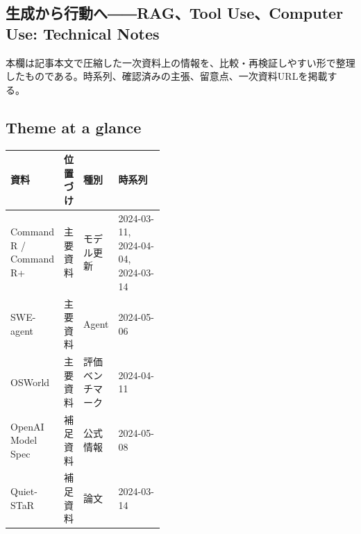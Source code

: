 \subsection*{生成から行動へ――RAG、Tool Use、Computer Use: Technical Notes}
本欄は記事本文で圧縮した一次資料上の情報を、比較・再検証しやすい形で整理したものである。時系列、確認済みの主張、留意点、一次資料URLを掲載する。
\medskip
\subsection*{Theme at a glance}
\begin{center}
\footnotesize
\begin{tabularx}{\linewidth}{@{}p{0.20\linewidth}p{0.10\linewidth}p{0.14\linewidth}X@{}}
\toprule
資料 & 位置づけ & 種別 & 時系列 \\
\midrule
Command R / Command R+ & 主要資料 & モデル更新 & 2024-03-11, 2024-04-04, 2024-03-14   \\
SWE-agent & 主要資料 & Agent & 2024-05-06   \\
OSWorld & 主要資料 & 評価ベンチマーク & 2024-04-11   \\
OpenAI Model Spec & 補足資料 & 公式情報 & 2024-05-08   \\
Quiet-STaR & 補足資料 & 論文 & 2024-03-14   \\
\bottomrule
\end{tabularx}
\end{center}
\normalsize

